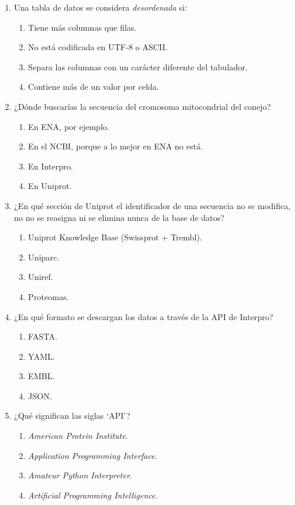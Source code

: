 \documentclass[a4paper,12pt]{article}
\begin{document}
\begin{enumerate}
\item Una tabla de datos se considera \emph{desordenada} si:
   \begin{enumerate}
   \item Tiene más columnas que filas.
   \item No está codificada en UTF-8 o ASCII.
   \item Separa las columnas con un carácter diferente del tabulador.
   \item Contiene más de un valor por celda.
   \end{enumerate}

\item ¿Dónde buscarías la secuencia del cromosoma mitocondrial del conejo?
   \begin{enumerate}
   \item En ENA, por ejemplo.
   \item En el NCBI, porque a lo mejor en ENA no está.
   \item En Interpro.
   \item En Uniprot.
   \end{enumerate}

\item ¿En qué sección de Uniprot el identificador de una secuencia no se modifica, no
no se reasigna ni se elimina nunca de la base de datos?
   \begin{enumerate}
   \item Uniprot Knowledge Base (Swissprot + Trembl).
   \item Uniparc.
   \item Uniref.
   \item Proteomas.
   \end{enumerate}

\item ¿En qué formato se descargan los datos a través de la API de Interpro?
   \begin{enumerate}
   \item FASTA.
   \item YAML.
   \item EMBL.
   \item JSON.
   \end{enumerate}

\item ¿Qué significan las siglas `API'?
   \begin{enumerate}
   \item \emph{American Protein Institute}.
   \item \emph{Application Programming Interface}.
   \item \emph{Amateur Python Interpreter}.
   \item \emph{Artificial Programming Intelligence}.
   \end{enumerate}


\end{enumerate}
\end{document}

